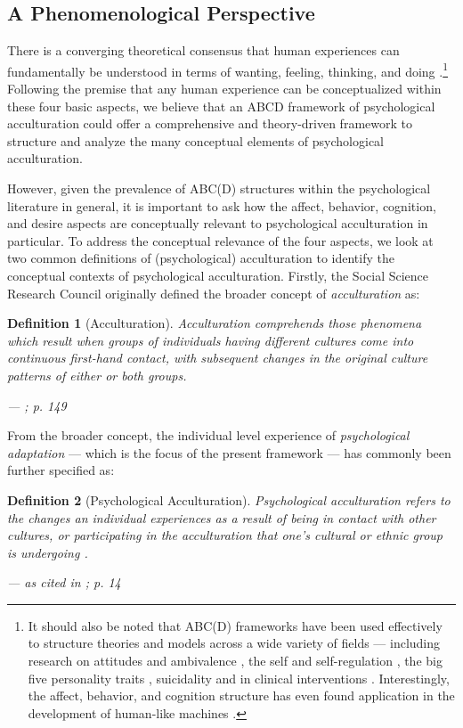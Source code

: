 \documentclass[man, 12pt, a4paper, mask]{apa7}
\newtheorem{definition}{Definition}
\begin{document}
\subsection{A Phenomenological Perspective}
There is a converging theoretical consensus that human experiences can fundamentally be understood in terms of wanting, feeling, thinking, and doing \citep[sometimes referred to as the ABCs or ABCDs of psychology: affect, behavior, cognition, desire; e.g.,][]{Cottam2010, Hogg2005, Jhangiani2014}.\footnote{It should also be noted that ABC(D) frameworks have been used effectively to structure theories and models across a wide variety of fields --- including research on attitudes \citep{Breckler1984} and ambivalence \citep{VanHarreveld2015}, the self \citep{Cote2009} and self-regulation \citep{Ben-Eliyahu2015}, the big five personality traits \citep{Wilt2016}, suicidality \citep{Harris2015} and in clinical interventions \citep{Eifert1989}. Interestingly, the affect, behavior, and cognition structure has even found application in the development of human-like machines \citep{Guo2020}.} Following the premise that any human experience can be conceptualized within these four basic aspects, we believe that an ABCD framework of psychological acculturation could offer a comprehensive and theory-driven framework to structure and analyze the many conceptual elements of psychological acculturation. 

However, given the prevalence of ABC(D) structures within the psychological literature in general, it is important to ask how the affect, behavior, cognition, and desire aspects are conceptually relevant to psychological acculturation in particular. To address the conceptual relevance of the four aspects, we look at two common definitions of (psychological) acculturation to identify the conceptual contexts of psychological acculturation. Firstly, the Social Science Research Council originally defined the broader concept of \textit{acculturation} as:
\begin{definition}[Acculturation]\label{def:acculturation}
Acculturation comprehends those phenomena which result when groups of individuals having different cultures come into continuous first-hand contact, with subsequent changes in the original culture patterns of either or both groups.

\hfill--- \citealp[][]{Redfield1936}; p. 149
\end{definition}
From the broader concept, the individual level experience of \textit{psychological adaptation} --- which is the focus of the present framework --- has commonly been further specified as:
\begin{definition}[Psychological Acculturation]\label{def:psychAcculturation}
Psychological acculturation refers to the changes an individual experiences as a result of being in contact with other cultures, or participating in the acculturation that one’s cultural or ethnic group is undergoing \citep[][]{Graves1967}. 
    
\hfill--- as cited in \citealp[][]{Sam2006}; p. 14
\end{definition}
\end{document}
